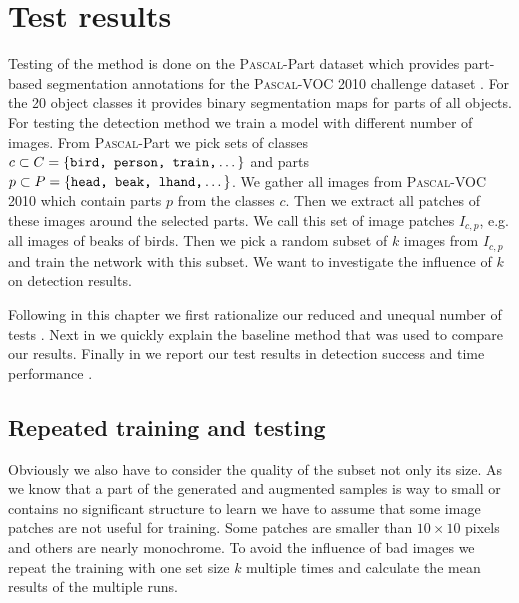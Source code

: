 %
\chapter{Test results}
\label{sec:results}
Testing of the method is done on the \textsc{Pascal}-Part dataset \citep{Chen_2014_CVPR} which provides part-based segmentation annotations for the \textsc{Pascal}-VOC 2010 challenge dataset \citep{pascal-voc-2010}. For the 20 object classes it provides binary segmentation maps for parts of all objects.\\
For testing the detection method we train a model with different number of images. From \textsc{Pascal}-Part we pick sets of classes $c \subset C = \{\texttt{bird, person, train,}\dotsc\}$ and parts $p \subset P = \{\texttt{head, beak, lhand,}\dotsc\}$. We gather all images from \textsc{Pascal}-VOC 2010 which contain parts $p$ from the classes $c$. Then we extract all patches of these images around the selected parts. We call this set of image patches $I_{c,p}$, e.g. all images of beaks of birds. Then we pick a random subset of $k$ images from $I_{c,p}$ and train the network with this subset. We want to investigate the influence of $k$ on detection results.

Following in this chapter we first rationalize our reduced and unequal number of tests . Next in  we quickly explain the baseline method that was used to compare our results. Finally in  we report our test results in detection success and time performance .

\section{Repeated training and testing}
\label{sec:results:repeat}
Obviously we also have to consider the quality of the subset not only its size. As we know that a part of the generated and augmented samples is way to small or contains no significant structure to learn we have to assume that some image patches are not useful for training. Some patches are smaller than $10\times10$ pixels and others are nearly monochrome. To avoid the influence of bad images we repeat the training with one set size $k$ multiple times and calculate the mean results of the multiple runs.

